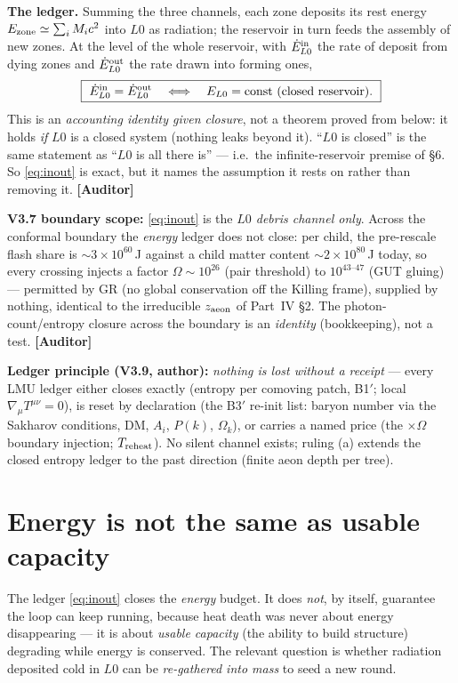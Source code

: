 \documentclass[11pt]{article}
\newcommand{\Auditor}{\textbf{\textcolor{teal!55!black}{[Auditor]}}}
\begin{document}
\textbf{The ledger.} Summing the three channels, each zone deposits its rest energy $E_{\rm zone}\simeq\sum_i M_i c^2$ into $L0$ as radiation; the reservoir in turn feeds the assembly of new zones. At the level of the whole reservoir, with $\dot E^{\rm in}_{L0}$ the rate of deposit from dying zones and $\dot E^{\rm out}_{L0}$ the rate drawn into forming ones,
\begin{equation}
\boxed{\ \dot E^{\rm in}_{L0}=\dot E^{\rm out}_{L0}\quad\Longleftrightarrow\quad E_{L0}=\text{const (closed reservoir).}\ }
\label{eq:inout}
\end{equation}
This is an \emph{accounting identity given closure}, not a theorem proved from below: it holds \emph{if} $L0$ is a closed system (nothing leaks beyond it). ``$L0$ is closed'' is the same statement as ``$L0$ is all there is'' --- i.e.\ the infinite-reservoir premise of \S6. So \eqref{eq:inout} is exact, but it names the assumption it rests on rather than removing it. \Auditor\par\textbf{V3.7 boundary scope:} \eqref{eq:inout} is the \emph{$L0$ debris channel only}. Across the conformal boundary the \emph{energy} ledger does not close: per child, the pre-rescale flash share is $\sim3\times10^{60}$\,J against a child matter content $\sim2\times10^{80}$\,J today, so every crossing injects a factor $\Omega\sim10^{26}$ (pair threshold) to $10^{43\text{--}47}$ (GUT gluing) --- permitted by GR (no global conservation off the Killing frame), supplied by nothing, identical to the irreducible $z_{\rm aeon}$ of Part~IV \S2. The photon-count/entropy closure across the boundary is an \emph{identity} (bookkeeping), not a test. \Auditor\par\textbf{Ledger principle (V3.9, author):} \emph{nothing is lost without a receipt} --- every LMU ledger either closes exactly (entropy per comoving patch, B1$'$; local $\nabla_\mu T^{\mu\nu}=0$), is reset by declaration (the B3$'$ re-init list: baryon number via the Sakharov conditions, DM, $A_i$, $P(k)$, $\Omega_k$), or carries a named price (the $\times\Omega$ boundary injection; $T_{\rm reheat}$). No silent channel exists; ruling (a) extends the closed entropy ledger to the past direction (finite aeon depth per tree).

\section{Energy is not the same as usable capacity}
The ledger \eqref{eq:inout} closes the \emph{energy} budget. It does \emph{not}, by itself, guarantee the loop can keep running, because heat death was never about energy disappearing --- it is about \emph{usable capacity} (the ability to build structure) degrading while energy is conserved. The relevant question is whether radiation deposited cold in $L0$ can be \emph{re-gathered into mass} to seed a new round.
\end{document}
